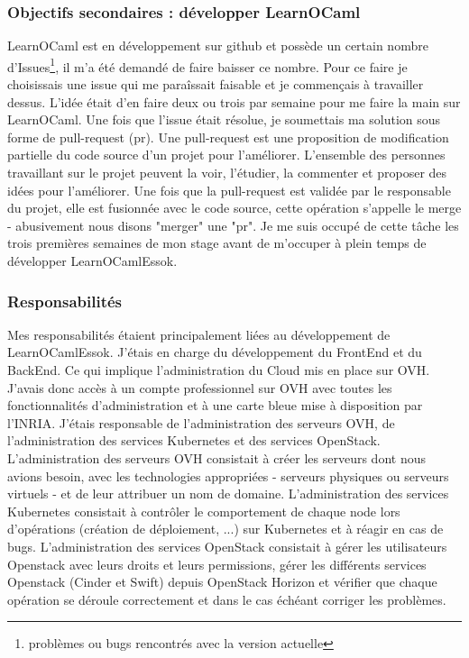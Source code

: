 \documentclass{article}
\begin{document}
\subsubsection{Objectifs secondaires : développer LearnOCaml}

LearnOCaml est en développement sur github et possède un certain nombre d'Issues\footnote{\label{Issues} problèmes ou bugs rencontrés avec la version actuelle}, il m'a été demandé de faire baisser ce nombre.
\newline
Pour ce faire je choisissais une issue qui me paraîssait faisable et je commençais à travailler dessus. L'idée était d'en faire deux ou trois par semaine pour me faire la main sur LearnOCaml.
\newline
Une fois que l'issue était résolue, je soumettais ma solution sous forme de pull-request (pr). Une pull-request est une proposition de modification partielle du code source d'un projet pour l'améliorer. L'ensemble des personnes travaillant sur le projet peuvent la voir, l'étudier, la commenter et proposer des idées pour l'améliorer. Une fois que la pull-request est validée par le responsable du projet, elle est fusionnée avec le code source, cette opération s'appelle le merge - abusivement nous disons "merger" une "pr".
\newline
Je me suis occupé de cette tâche les trois premières semaines de mon stage avant de m'occuper à plein temps de développer LearnOCamlEssok.

\subsubsection{Responsabilités}

Mes responsabilités étaient principalement liées au développement de LearnOCamlEssok. J'étais en charge du développement du FrontEnd et du BackEnd. Ce qui implique l'administration du Cloud mis en place sur OVH.
\newline
J'avais donc accès à un compte professionnel sur OVH avec toutes les fonctionnalités d'administration et à une carte bleue mise à disposition par l'INRIA. J'étais responsable de l'administration des serveurs OVH, de l'administration des services Kubernetes et des services OpenStack.
\newline
L'administration des serveurs OVH consistait à créer les serveurs dont nous avions besoin, avec les technologies appropriées - serveurs physiques ou serveurs virtuels - et de leur attribuer un nom de domaine.
\newline
L'administration des services Kubernetes consistait à contrôler le comportement de chaque node lors d'opérations (création de déploiement, ...) sur Kubernetes et à réagir en cas de bugs.
\newline
L'administration des services OpenStack consistait à gérer les utilisateurs Openstack avec leurs droits et leurs permissions, gérer les différents services Openstack (Cinder et Swift) depuis OpenStack Horizon et vérifier que chaque opération se déroule correctement et dans le cas échéant corriger les problèmes.
\end{document}
